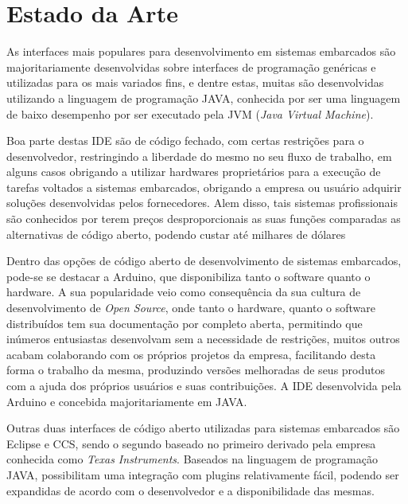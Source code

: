 \chapter{Estado da Arte}
As interfaces mais populares para desenvolvimento em sistemas embarcados são majoritariamente desenvolvidas sobre interfaces de programação genéricas e utilizadas para os mais variados fins, e dentre estas, muitas são desenvolvidas utilizando a linguagem de programação JAVA, conhecida por ser uma linguagem de baixo desempenho por ser executado pela JVM (\textit{Java Virtual Machine}).


Boa parte destas IDE são de código fechado, com certas restrições para o desenvolvedor, restringindo a liberdade do mesmo no seu fluxo de trabalho, em alguns casos obrigando a utilizar hardwares proprietários para a execução de tarefas voltados a sistemas embarcados, obrigando a empresa ou usuário adquirir soluções desenvolvidas pelos fornecedores. Alem disso, tais sistemas profissionais são conhecidos por terem preços desproporcionais as suas funções comparadas as alternativas de código aberto, podendo custar até milhares de dólares %

Dentro das opções de código aberto de desenvolvimento de sistemas embarcados, pode-se se destacar a Arduino, que disponibiliza tanto o software quanto o hardware. A sua popularidade veio como consequência da sua cultura de desenvolvimento de \textit{Open Source}, onde tanto o hardware, quanto o software distribuídos tem sua documentação por completo aberta, permitindo que inúmeros entusiastas desenvolvam sem a necessidade de restrições, muitos outros acabam colaborando com os próprios projetos da empresa, facilitando desta forma o trabalho da mesma, produzindo versões melhoradas de seus produtos com a ajuda dos próprios usuários e suas contribuições. A IDE desenvolvida pela Arduino e concebida majoritariamente em JAVA.

Outras duas interfaces de código aberto utilizadas para sistemas embarcados são Eclipse e CCS, sendo o segundo baseado no primeiro
derivado pela empresa conhecida como \textit{Texas Instruments}. Baseados na linguagem de programação JAVA, possibilitam uma
integração com plugins relativamente fácil, podendo ser expandidas de acordo com o desenvolvedor e a disponibilidade das mesmas.

